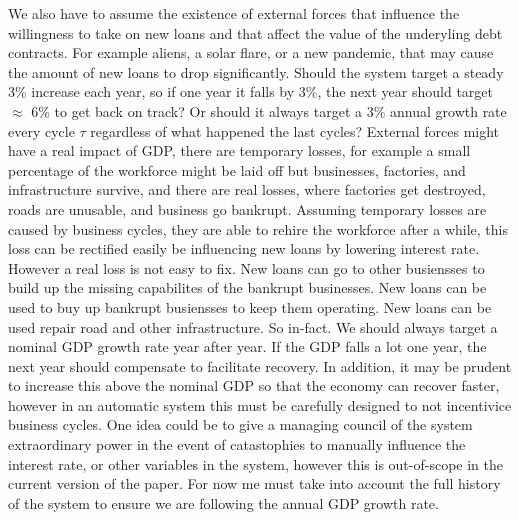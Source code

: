 We also have to assume the existence of external forces that influence the willingness to take on new loans and that affect the value of the underyling debt contracts. For example aliens, a solar flare, or a new pandemic, that may cause the amount of new loans to drop significantly. Should the system target a steady 3\% increase each year, so if one year it falls by 3\%, the next year should target $\approx$ 6\% to get back on track? Or should it always target a 3\% annual growth rate every cycle $\tau$ regardless of what happened the last cycles? External forces might have a real impact of GDP, there are temporary losses, for example a small percentage of the workforce might be laid off but businesses, factories, and infrastructure survive, and there are real losses, where factories get destroyed, roads are unusable, and business go bankrupt. Assuming temporary losses are caused by business cycles, they are able to rehire the workforce after a while, this loss can be rectified easily be influencing new loans by lowering interest rate. However a real loss is not easy to fix. New loans can go to other busiensses to build up the missing capabilites of the bankrupt businesses. New loans can be used to buy up bankrupt busiensses to keep them operating. New loans can be used repair road and other infrastructure. So in-fact. We should always target a nominal GDP growth rate year after year. If the GDP falls a lot one year, the next year should compensate to facilitate recovery. In addition, it may be prudent to increase this above the nominal GDP so that the economy can recover faster, however in an automatic system this must be carefully designed to not incentivice business cycles. One idea could be to give a managing council of the system extraordinary power in the event of catastophies to manually influence the interest rate, or other variables in the system, however this is out-of-scope in the current version of the paper. For now me must take into account the full history of the system to ensure we are following the annual GDP growth rate.


